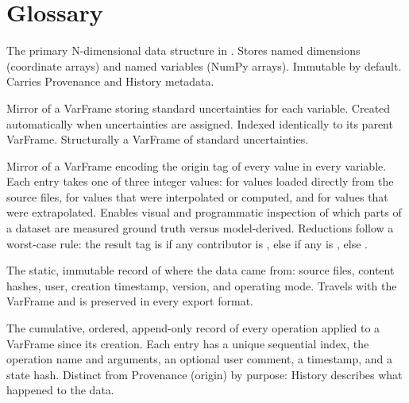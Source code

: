 
\section*{Glossary}

\begin{description}[style=nextline,leftmargin=0pt]

\item[VarFrame]
The primary N-dimensional data structure in \itc{}. Stores named dimensions
(coordinate arrays) and named variables (NumPy arrays). Immutable by default.
Carries Provenance and History metadata.

\item[UncFrame]
Mirror of a VarFrame storing standard uncertainties for each variable. Created
automatically when uncertainties are assigned. Indexed identically to its
parent VarFrame. Structurally a VarFrame of standard uncertainties.

\item[HistoryFrame]
Mirror of a VarFrame encoding the origin tag of every value in every variable.
Each entry takes one of three integer values:  for values loaded
directly from the source files,  for values that were interpolated or
computed, and  for values that were extrapolated. Enables visual and
programmatic inspection of which parts of a dataset are measured ground truth
versus model-derived. Reductions follow a worst-case rule: the result tag is
 if any contributor is , else  if any is ,
else .

\item[Provenance]
The static, immutable record of where the data came from: source files,
content hashes, user, creation timestamp, \itc{} version, and operating mode.
Travels with the VarFrame and is preserved in every export format.

\item[History]
The cumulative, ordered, append-only record of every operation applied to a
VarFrame since its creation. Each entry has a unique sequential index, the
operation name and arguments, an optional user comment, a timestamp, and a
state hash. Distinct from Provenance (origin) by purpose: History describes
what happened to the data.


\end{description}
